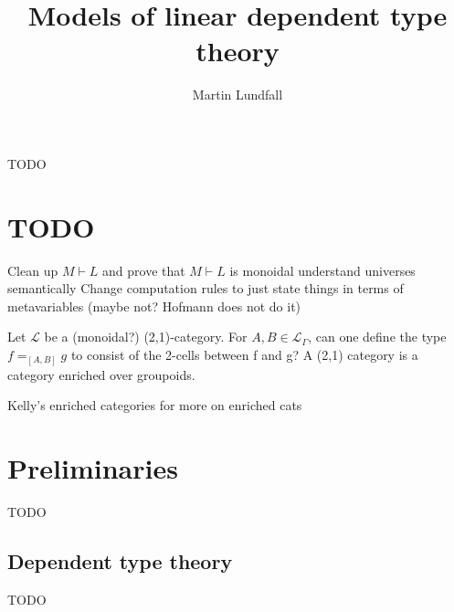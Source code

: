 
\usepackage[margin=0.5in]{geometry}

\title{Models of linear dependent type theory}
\author{Martin Lundfall}
\maketitle
\abstract
TODO
\newpage
\tableofcontents
\newpage
\section{TODO}
Clean up $M \vdash L$ and prove that $M \vdash L$ is monoidal
understand universes semantically
Change computation rules to just state things in terms of metavariables (maybe not? Hofmann does not do it)

Let $\mathcal{L}$ be a (monoidal?) (2,1)-category. For $A, B \in \mathcal{L}_{\Gamma}$, can one define the type $f =_{[A, B]} g$ to consist of the 2-cells between f and g?
A (2,1) category is a category enriched over groupoids.

Kelly's enriched categories for more on enriched cats
\section{Preliminaries}
TODO
\subsection{Dependent type theory}
TODO
